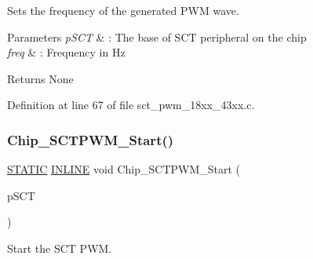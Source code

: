 Sets the frequency of the generated P\+WM wave. 


\begin{DoxyParams}{Parameters}
{\em p\+S\+CT} & \+: The base of S\+CT peripheral on the chip \\
\hline
{\em freq} & \+: Frequency in Hz \\
\hline
\end{DoxyParams}
\begin{DoxyReturn}{Returns}
None 
\end{DoxyReturn}


Definition at line 67 of file sct\+\_\+pwm\+\_\+18xx\+\_\+43xx.\+c.

\mbox{\label{group___s_c_t___p_w_m__18_x_x__43_x_x_ga732ad07a287df19b9e0f13b7402476d4}} 
\subsubsection{\texorpdfstring{Chip\+\_\+\+S\+C\+T\+P\+W\+M\+\_\+\+Start()}{Chip\_SCTPWM\_Start()}}
{\footnotesize\ttfamily \hyperlink{group___l_p_c___types___public___macros_ga10b2d890d871e1489bb02b7e70d9bdfb}{S\+T\+A\+T\+IC} \hyperlink{spifi__18xx__43xx_8h_a2eb6f9e0395b47b8d5e3eeae4fe0c116}{I\+N\+L\+I\+NE} void Chip\+\_\+\+S\+C\+T\+P\+W\+M\+\_\+\+Start (\begin{DoxyParamCaption}\item[{\hyperlink{struct_l_p_c___s_c_t___t}{L\+P\+C\+\_\+\+S\+C\+T\+\_\+T} $\ast$}]{p\+S\+CT }\end{DoxyParamCaption})}



Start the S\+CT P\+WM. 


